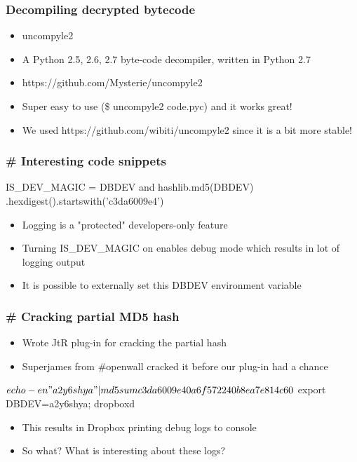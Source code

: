 \documentclass{beamer}
\begin{document}
\begin{frame}
\frametitle{Decompiling decrypted bytecode}
\begin{itemize}
\itemsep 2em
\item uncompyle2

\item A Python 2.5, 2.6, 2.7 byte-code decompiler, written in Python 2.7

\item https://github.com/Mysterie/uncompyle2

\item Super easy to use (\$ uncompyle2 code.pyc) and it works great!

\item We used https://github.com/wibiti/uncompyle2 since it is a bit more stable!
\end{itemize}
\end{frame}

\begin{frame}[fragile]
\frametitle{\# Interesting code snippets}
\begin{python}
    IS_DEV_MAGIC = DBDEV and hashlib.md5(DBDEV)
        .hexdigest().startswith('c3da6009e4')
\end{python}
\begin{itemize}
\itemsep 2em
\item Logging is a "protected" developers-only feature
\item Turning IS\_DEV\_MAGIC on enables debug mode which results in lot of logging output
\item It is possible to externally set this DBDEV environment variable
\end{itemize}
\end{frame}

\begin{frame}[fragile]
\frametitle{\# Cracking partial MD5 hash}
\begin{itemize}
\itemsep 1.8em
\item Wrote JtR plug-in for cracking the partial hash
\item Superjames from \#openwall cracked it before our plug-in had a chance
\end{itemize}
\begin{python}
    $ echo -en "a2y6shya" | md5sum
       c3da6009e40a6f572240b8ea7e814c60

    $ export DBDEV=a2y6shya; dropboxd
\end{python}
\begin{itemize}
\item This results in Dropbox printing debug logs to console
\item So what? What is interesting about these logs?
\end{itemize}
\end{frame}
\end{document}
